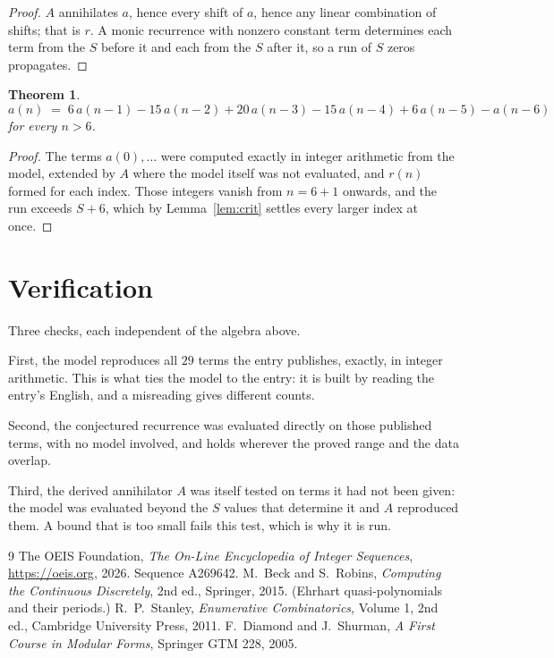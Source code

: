 \documentclass[11pt,a4paper]{article}
\theoremstyle{plain}
\newtheorem{theorem}{Theorem}
\theoremstyle{definition}
\begin{document}
\begin{proof}
$A$ annihilates $a$, hence every shift of $a$, hence any linear combination of shifts; that is
$r$. A monic recurrence with nonzero constant term determines each term from the $S$ before it
and each from the $S$ after it, so a run of $S$ zeros propagates.
\end{proof}

\begin{theorem}
\[
a(n)\;=\;6\,a(n-1) - 15\,a(n-2) + 20\,a(n-3) - 15\,a(n-4) + 6\,a(n-5) - a(n-6)
\]
for every $n>6$.
\end{theorem}

\begin{proof}
The terms $a(0),\dots$ were computed exactly in integer arithmetic from the model, extended by
$A$ where the model itself was not evaluated, and $r(n)$ formed for each index. Those integers
vanish from $n=6+1$ onwards, and the run exceeds $S+6$, which by
Lemma~\ref{lem:crit} settles every larger index at once.
\end{proof}

\section{Verification}

Three checks, each independent of the algebra above.

First, the model reproduces all $29$ terms the entry publishes, exactly, in integer
arithmetic. This is what ties the model to the entry: it is built by reading the entry's
English, and a misreading gives different counts.

Second, the conjectured recurrence was evaluated directly on those published terms, with no
model involved, and holds wherever the proved range and the data overlap.

Third, the derived annihilator $A$ was itself tested on terms it had not been given: the model
was evaluated beyond the $S$ values that determine it and $A$ reproduced them. A bound that is
too small fails this test, which is why it is run.

\begin{thebibliography}{9}
 The OEIS Foundation, \emph{The On-Line Encyclopedia of Integer
Sequences}, \url{https://oeis.org}, 2026. Sequence A269642.
 M.~Beck and S.~Robins, \emph{Computing the Continuous Discretely},
2nd ed., Springer, 2015. (Ehrhart quasi-polynomials and their periods.)
 R.~P.~Stanley, \emph{Enumerative Combinatorics}, Volume 1, 2nd ed.,
Cambridge University Press, 2011.
 F.~Diamond and J.~Shurman, \emph{A First Course in Modular Forms},
Springer GTM 228, 2005.
\end{thebibliography}
\end{document}
